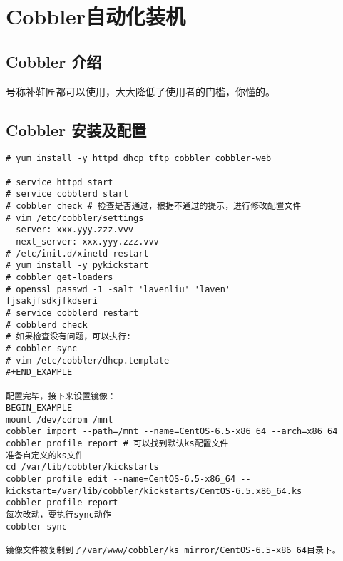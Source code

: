 \chapter{Cobbler自动化装机}
\label{chap:cobbler}

\section{Cobbler 介绍}

号称补鞋匠都可以使用，大大降低了使用者的门槛，你懂的。

\section{Cobbler 安装及配置}

\begin{verbatim}
# yum install -y httpd dhcp tftp cobbler cobbler-web

# service httpd start
# service cobblerd start
# cobbler check # 检查是否通过，根据不通过的提示，进行修改配置文件
# vim /etc/cobbler/settings
  server: xxx.yyy.zzz.vvv
  next_server: xxx.yyy.zzz.vvv
# /etc/init.d/xinetd restart
# yum install -y pykickstart
# cobbler get-loaders
# openssl passwd -1 -salt 'lavenliu' 'laven'
fjsakjfsdkjfkdseri
# service cobblerd restart
# cobblerd check
# 如果检查没有问题，可以执行:
# cobbler sync
# vim /etc/cobbler/dhcp.template
#+END_EXAMPLE

配置完毕，接下来设置镜像：
BEGIN_EXAMPLE
mount /dev/cdrom /mnt
cobbler import --path=/mnt --name=CentOS-6.5-x86_64 --arch=x86_64
cobbler profile report # 可以找到默认ks配置文件
准备自定义的ks文件
cd /var/lib/cobbler/kickstarts
cobbler profile edit --name=CentOS-6.5-x86_64 --kickstart=/var/lib/cobbler/kickstarts/CentOS-6.5.x86_64.ks
cobbler profile report
每次改动，要执行sync动作
cobbler sync
  
镜像文件被复制到了/var/www/cobbler/ks_mirror/CentOS-6.5-x86_64目录下。
\end{verbatim}

